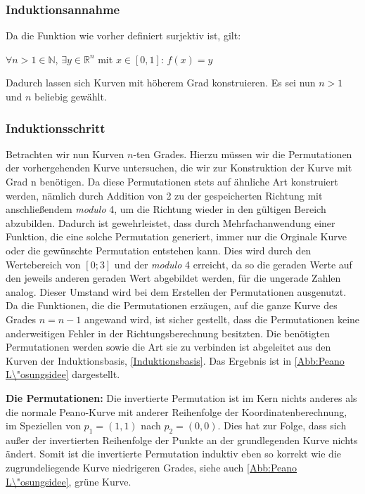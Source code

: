 \documentclass[course=asp]{aspdoc}
\begin{document}
\subsubsection{Induktionsannahme} \label{Induktionsannahme}
Da die Funktion wie vorher definiert surjektiv ist, gilt:

\begin{center}
$\forall n > 1 \in \mathbb{N}$, $\exists y \in \mathbb{R}^n$ mit $x \in [0,1]$: $f(x)= y$	%
\end{center}

Dadurch lassen sich Kurven mit h\"oherem Grad konstruieren. Es sei nun $n > 1$ und $n$ beliebig gew\"ahlt.

\subsubsection{Induktionsschritt} \label{Induktionsschritt}
Betrachten wir nun Kurven $n$-ten Grades. Hierzu m\"ussen wir die Permutationen der vorhergehenden Kurve untersuchen, die wir zur Konstruktion der Kurve mit Grad n ben\"otigen.
Da diese Permutationen stets auf \"ahnliche Art konstruiert werden, n\"amlich durch Addition von 2 zu der gespeicherten Richtung mit anschlie\ss endem \textit{modulo} 4, um die Richtung wieder in den g\"ultigen Bereich abzubilden. Dadurch ist gewehrleistet, dass durch Mehrfachanwendung einer Funktion, die eine solche Permutation generiert, immer nur die Orginale Kurve oder die gew\"unschte Permutation entstehen kann. Dies wird durch den Wertebereich von $[0;3]$ und der \textit{modulo} 4 erreicht, da so die geraden Werte auf den jeweils anderen geraden Wert abgebildet werden, f\"ur die ungerade Zahlen analog. Dieser Umstand wird bei dem Erstellen der Permutationen ausgenutzt.
Da die Funktionen, die die Permutationen erz\"augen, auf die ganze Kurve des Grades $n = n - 1$ angewand wird, ist sicher gestellt, dass die Permutationen keine anderweitigen Fehler in der Richtungsberechnung besitzten.
Die ben\"otigten Permutationen werden sowie die Art sie zu verbinden ist abgeleitet aus den Kurven der Induktionsbasis, \ref{Induktionsbasis}. Das Ergebnis ist in \ref{Abb:Peano L\"osungsidee} dargestellt.

\textbf{Die Permutationen: }%
Die invertierte Permutation ist im Kern nichts anderes als die normale Peano-Kurve mit anderer Reihenfolge der Koordinatenberechnung, im Speziellen von $p_1=(1,1)$ nach $p_2 = (0,0)$. Dies hat zur Folge, dass sich au\ss er der invertierten Reihenfolge der Punkte an der grundlegenden Kurve nichts \"andert. Somit ist die invertierte Permutation induktiv eben so korrekt wie die zugrundeliegende Kurve niedrigeren Grades, siehe auch \ref{Abb:Peano L\"osungsidee}, gr\"une Kurve.
\end{document}
